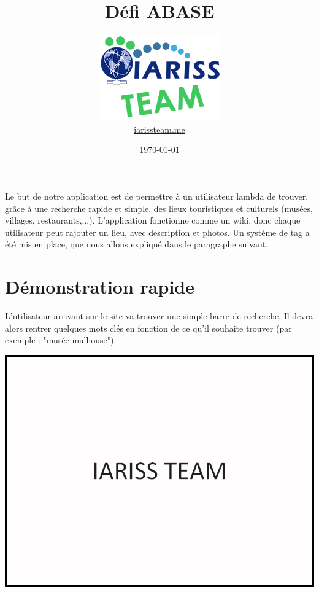 \documentclass[12pt, a4paper]{article}
\title{Défi ABASE}
\newcommand{\espace}{\vspace{.8cm}}
\begin{document}
\author{\includegraphics{../_img/iariss_team.png} \\ {\sffamily \href{http://iarissteam.me}{iarissteam.me}}}
\date{\today}

\maketitle{}

{\sffamily Le but de notre application est de permettre à un utilisateur lambda de trouver, grâce à une recherche rapide et simple, des lieux touristiques et culturels (musées, villages, restaurants,...). L'application fonctionne comme un wiki, donc chaque utilisateur peut rajouter un lieu, avec description et photos. Un système de tag a été mis en place, que nous allons expliqué dans le paragraphe suivant.} 

\espace{}
\section{Démonstration rapide}
L'utilisateur arrivant sur le site va trouver une simple barre de recherche. Il devra alors rentrer quelques mots clés en fonction de ce qu'il souhaite trouver (par exemple : "musée mulhouse").

\espace{}
\includegraphics[width=.9\textwidth, keepaspectratio=true]{img/test.png}
\end{document}
